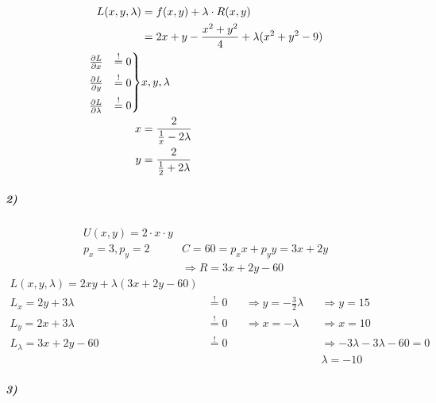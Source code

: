 \begin{align*}
	L(x, y, \lambda) & = f(x, y) + \lambda \cdot R(x, y)                       \\
	                 & = 2x + y - \frac{x^2 + y^2}{4} + \lambda(x^2 + y^2 - 9) \\
	\begin{rcases}
		\frac{\partial L}{\partial x} &\overset{!}{=} 0 \\
		\frac{\partial L}{\partial y} &\overset{!}{=} 0 \\
		\frac{\partial L}{\partial \lambda} &\overset{!}{=} 0
	\end{rcases}
	                 & x, y, \lambda                                           \\
	x                & = \frac{2}{\frac{1}{x} - 2 \lambda}                     \\
	y                & = \frac{2}{\frac{1}{2} + 2 \lambda}
\end{align*}

\subparagraph{2)}

\begin{align*}
	U(x, y) = 2 \cdot x \cdot y                                \\
	p_x = 3, p_y = 2 \qquad & C = 60 = p_x x + p_y y = 3x + 2y \\
	                        & \Rightarrow R = 3x + 2y - 60
\end{align*}
\begin{align*}
	L(x, y, \lambda) = 2xy + \lambda (3x + 2y - 60)                                                                                            \\
	L_x = 2 y + 3 \lambda      & \overset{!}{=} 0 &  & \Rightarrow y = - \frac{3}{2} \lambda &  & \Rightarrow y = 15                           \\
	L_y = 2 x + 3 \lambda      & \overset{!}{=} 0 &  & \Rightarrow x = - \lambda             &  & \Rightarrow x = 10                           \\
	L_\lambda = 3 x + 2 y - 60 & \overset{!}{=} 0 &  &                                       &  & \Rightarrow - 3 \lambda - 3 \lambda - 60 = 0 \\
	                           &                  &  &                                       &  & \lambda = -10
\end{align*}


\subparagraph{3)}

